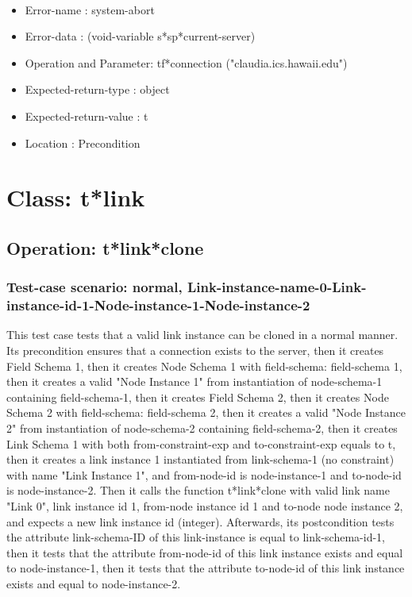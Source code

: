\
\begin {itemize}
\item 	Error-name             : system-abort
\item Error-data             : (void-variable s*sp*current-server)
\item Operation and Parameter: tf*connection ("claudia.ics.hawaii.edu")
\item Expected-return-type   : object
\item Expected-return-value  : t
\item Location               : Precondition



\end {itemize}
\section {Class: t*link}
\subsection {Operation: t*link*clone}
\subsubsection {Test-case scenario: normal, Link-instance-name-0-Link-instance-id-1-Node-instance-1-Node-instance-2}


This test case tests that a valid link instance can be cloned in a normal manner.
Its precondition ensures that a connection exists to the server, then it creates Field Schema 1, then it creates Node Schema 1 with field-schema: field-schema 1, then it creates a valid "Node Instance 1" from instantiation of node-schema-1 containing field-schema-1, then it creates Field Schema 2, then it creates Node Schema 2 with field-schema: field-schema 2, then it creates a valid "Node Instance 2" from instantiation of node-schema-2 containing field-schema-2, then it creates Link Schema 1 with both from-constraint-exp and to-constraint-exp equals to t, then it creates a link instance 1 instantiated from  link-schema-1 (no constraint) with name "Link Instance 1", and from-node-id is node-instance-1 and to-node-id is node-instance-2.
Then it calls the function t*link*clone  with valid link name "Link 0", link instance id 1, from-node instance id 1 and to-node node instance 2, and expects a new link instance id (integer).
Afterwards, its postcondition tests the attribute link-schema-ID of this link-instance is equal to link-schema-id-1, then it tests that the attribute from-node-id of this link instance exists and equal to node-instance-1, then it tests that the attribute to-node-id of this link instance exists and equal to node-instance-2.


